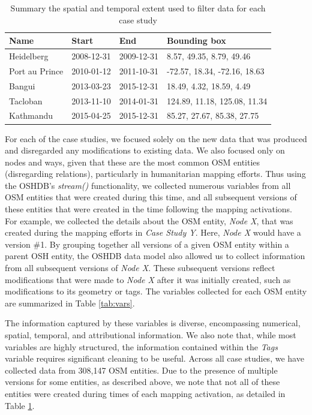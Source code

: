 \begin{table}
\centering
\caption{Summary the spatial and temporal extent used to filter data for each case study}
\label{tab:cases}
\begin{tabular}{llll}
\toprule
Name                     & Start      & End        & Bounding box                 \\
\midrule
Heidelberg               & 2008-12-31 & 2009-12-31 & 8.57, 49.35, 8.79, 49.46     \\
Port au Prince         & 2010-01-12 & 2011-10-31 & -72.57, 18.34, -72.16, 18.63 \\
Bangui & 2013-03-23 & 2015-12-31 & 18.49, 4.32, 18.59, 4.49     \\
Tacloban           & 2013-11-10 & 2014-01-31 & 124.89, 11.18, 125.08, 11.34 \\
Kathmandu         & 2015-04-25 & 2015-12-31 & 85.27, 27.67, 85.38, 27.75  \\
\bottomrule
\end{tabular}
\end{table}

For each of the case studies, we focused solely on the new data that was produced and disregarded any modifications to existing data. We also focused only on nodes and ways, given that these are the most common OSM entities (disregarding relations), particularly in humanitarian mapping efforts. Thus using the OSHDB's \textit{stream()} functionality, we collected numerous variables from all OSM entities that were created during this time, and all subsequent versions of these entities that were created in the time following the mapping activations. For example, we collected the details about the OSM entity, \textit{Node X}, that was created during the mapping efforts in \textit{Case Study Y}. Here, \textit{Node X} would have a version \#1. By grouping together all versions of a given OSM entity within a parent OSH entity, the OSHDB data model also allowed us to collect information from all subsequent versions of \textit{Node X}. These subsequent versions reflect modifications that were made to \textit{Node X} after it was initially created, such as modifications to its geometry or tags. The variables collected for each OSM entity are summarized in Table \ref{tab:vars}. 

The information captured by these variables is diverse, encompassing numerical, spatial, temporal, and attributional information. We also note that, while most variables are highly structured, the information contained within the \textit{Tags} variable requires significant cleaning to be useful. Across all case studies, we have collected data from 308,147 OSM entities. Due to the presence of multiple versions for some entities, as described above, we note that not all of these entities were created during times of each mapping activation, as detailed in Table \ref{tab:cases}.

